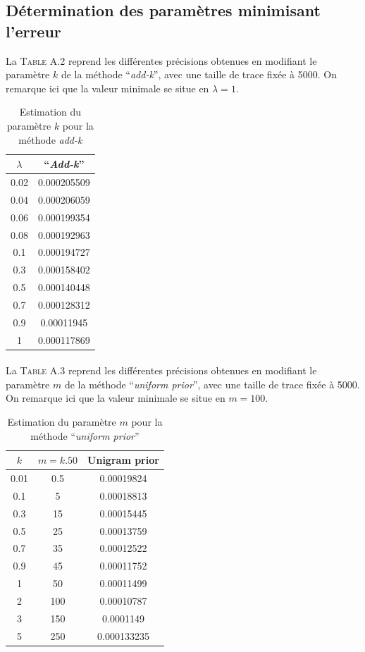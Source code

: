\documentclass[a4paper,titlepage]{report}
\begin{document}
\subsection{Détermination des paramètres minimisant l'erreur}

La \textsc{Table A.2} reprend les différentes précisions obtenues en modifiant le paramètre $k$ de la méthode ``\textit{add-k}'', avec une taille de trace fixée à 5000. On remarque ici que la valeur minimale se situe en $\lambda = 1$.
\begin{table}[h]
	\center
	\begin{tabular}{c|c}
		$\lambda$ & ``\textit{Add-k}''\\
		\hline
		0.02 & \num{0.000205509}\\
		0.04 & \num{0.000206059}\\
		0.06 & \num{0.000199354}\\
		0.08 & \num{0.000192963}\\
		0.1 & \num{0.000194727}\\
		0.3 & \num{0.000158402}\\
		0.5 & \num{0.000140448}\\
		0.7 & \num{0.000128312}\\
		0.9 & \num{0.00011945}\\
		1 & \num{0.000117869}
	\end{tabular}
	\caption{Estimation du paramètre $k$ pour la méthode \textit{add-k}}
\end{table}

\paragraph{}
La \textsc{Table A.3} reprend les différentes précisions obtenues en modifiant le paramètre $m$ de la méthode ``\textit{uniform prior}'', avec une taille de trace fixée à 5000. On remarque ici que la valeur minimale se situe en $m = 100$.

\begin{table}[h]
	\center
	\begin{tabular}{c|c|c}
		$k$ & $m = k . 50$ & Unigram prior\\
		\hline
		0.01 & 0.5 & \num{0.00019824}\\
		0.1 & 5 & \num{0.00018813}\\
		0.3 & 15 & \num{0.00015445}\\
		0.5 & 25 & \num{0.00013759}\\
		0.7 & 35 & \num{0.00012522}\\
		0.9 & 45 & \num{0.00011752}\\
		1 & 50 & \num{0.00011499}\\
		2 & 100 & \num{0.00010787}\\
		3 & 150 & \num{0.0001149}\\
		5 & 250 & \num{0.000133235}
	\end{tabular}
	\caption{Estimation du paramètre $m$ pour la méthode ``\textit{uniform prior}''}
\end{table}
\end{document}
